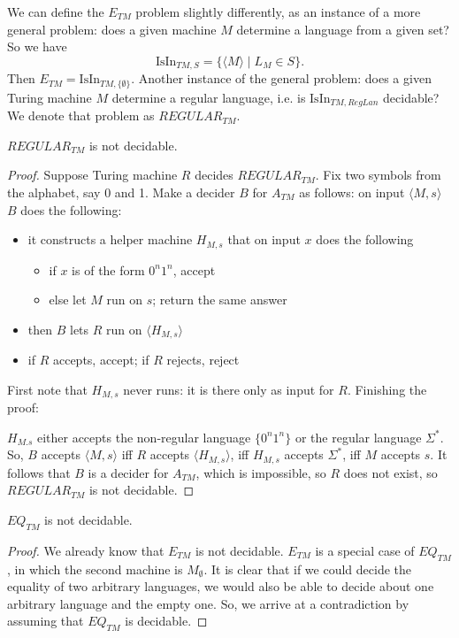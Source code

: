 We can define the $E_{TM}$ problem slightly differently, as an instance
of a more general problem: does a given machine $M$ determine a language
from a given set? So we have
\begin{equation*}
	\text{IsIn}_{TM,S} = \{\langle M \rangle\mid L_M \in S\}.
\end{equation*}
Then $E_{TM} = \text{IsIn}_{TM,\{\emptyset\}}$. Another instance of the general problem: does a given Turing machine $M$ determine a regular language, i.e. is $\text{IsIn}_{TM,RegLan}$ decidable? We denote that problem as $REGULAR_{TM}$.

\begin{theorem}
$REGULAR_{TM}$ is not decidable.
\end{theorem}
\begin{proof}
Suppose Turing machine $R$ decides $REGULAR_{TM}$. Fix two symbols
from the alphabet, say 0 and 1. Make a decider $B$ for $A_{TM}$ as
follows: on input $\langle M,s \rangle$ $B$ does the following:
\begin{itemize}
\item it constructs a helper machine $H_{M,s}$ that on input $x$ does
  the following
\begin{itemize}
\item if $x$ is of the form $0^n1^n$, accept
\item else let $M$ run on $s$; return the same answer
\end{itemize}

\item then $B$ lets $R$ run on  $\langle H_{M,s} \rangle$
\item if $R$ accepts, accept; if $R$ rejects, reject
\end{itemize}

First note that $H_{M,s}$ never runs: it is there only as input for
$R$. Finishing the proof:


$H_{M.s}$ either accepts the non-regular language $\{0^n1^n\}$
or the regular language $\Sigma^*$. So, $B$ accepts $\langle
M,s \rangle$ iff $R$ accepts $\langle H_{M,s} \rangle$, iff $H_{M,s}$
accepts $\Sigma^*$, iff $M$ accepts $s$. It follows that $B$ is a
decider for $A_{TM}$, which is impossible, so $R$ does not exist, so
$REGULAR_{TM}$ is not decidable.
\end{proof}

\begin{theorem} \label{reduction1}
$EQ_{TM}$ is not decidable.
\end{theorem}
\begin{proof}
We already know that $E_{TM}$ is not decidable. $E_{TM}$ is a special
case of $EQ_{TM}$, in which the second machine is $M_{\emptyset}$. It is
clear that if we could decide the equality of two arbitrary languages,
we would also be able to decide about one arbitrary language
and the empty one. So, we arrive at a contradiction by assuming that
$EQ_{TM}$ is decidable.
\end{proof}

